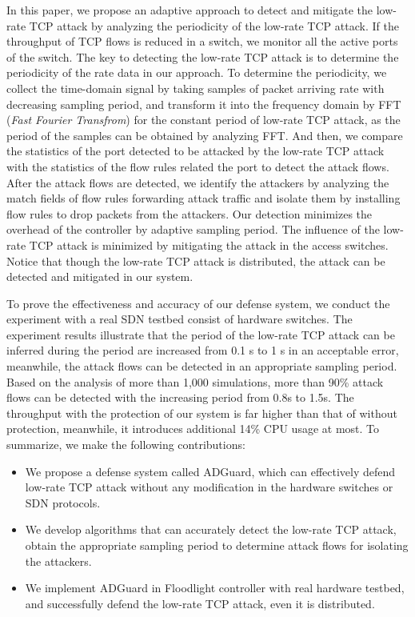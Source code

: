 \documentclass[conference]{IEEEtran}
\newcommand{\TheName}{ADGuard}
\begin{document}
In this paper, we propose an adaptive approach to detect and mitigate the low-rate TCP attack by analyzing the periodicity of the low-rate TCP attack. If the throughput of TCP flows is reduced in a switch, we monitor all the active ports of the switch. The key to detecting the low-rate TCP attack is to determine the periodicity of the rate data in our approach. To determine the periodicity, we collect the time-domain signal by taking samples of packet arriving rate with decreasing sampling period, and transform it into the frequency domain by FFT (\emph{Fast Fourier Transfrom}) for the constant period of low-rate TCP attack, as the period of the samples can be obtained by analyzing FFT. And then, we compare the statistics of the port detected to be attacked by the low-rate TCP attack with the statistics of the flow rules related the port to detect the attack flows. After the attack flows are detected, we identify the attackers by analyzing the match fields of flow rules forwarding attack traffic and isolate them by installing flow rules to drop packets from the attackers. Our detection minimizes the overhead of the controller by adaptive sampling period. The influence of the low-rate TCP attack is minimized by mitigating the attack in the access switches. Notice that though the low-rate TCP attack is distributed, the attack can be detected and mitigated in our system.

To prove the effectiveness and accuracy of our defense system, we conduct the experiment with a real SDN testbed consist of hardware switches. The experiment results illustrate that the period of the low-rate TCP attack can be inferred during the period are increased from 0.1 s to 1 s in an acceptable error, meanwhile, the attack flows can be detected in an appropriate sampling period. Based on the analysis of more than 1,000 simulations, more than 90\% attack flows can be detected with the increasing period from 0.8s to 1.5s. The throughput with the protection of our system is far higher than that of without protection, meanwhile, it introduces additional 14\% CPU usage at most. To summarize, we make the following contributions:

\begin{itemize}

\item We propose a defense system called \TheName{}, which can effectively defend low-rate TCP attack without any modification in the hardware switches or SDN protocols.  
\item We develop algorithms that can accurately detect the low-rate TCP attack, obtain the appropriate sampling period to determine attack flows for isolating the attackers.
\item We implement \TheName{} in Floodlight controller with real hardware testbed, and successfully defend the low-rate TCP attack, even it is distributed.

\end{itemize}
\end{document}
